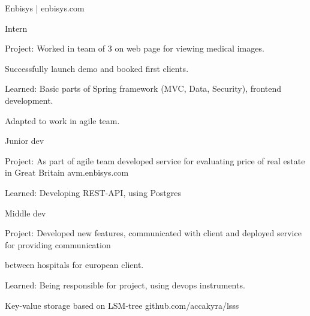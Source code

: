 \documentclass[]{cv-style}
\begin{document}
    {\large{Enbisys | enbisys.com}}
    {\par}
    \vspace{0.2cm}
    {Intern}
    {\par}
    \hspace*{0.7cm} Project: Worked in team of 3 on web page for viewing medical images.
    {\par}
    \hspace*{0.7cm} Successfully launch demo and booked first clients.
    {\par}
    \hspace*{0.7cm} Learned: Basic parts of Spring framework (MVC, Data, Security), frontend development.
    {\par}
    \hspace*{0.7cm} Adapted to work in agile team.
    {\par}
    \vspace{0.1cm}
    {Junior dev}
    {\par}
    \hspace*{0.7cm} Project: As part of agile team developed service for evaluating price of real estate in Great Britain
    avm.enbisys.com
    {\par}
    \hspace*{0.7cm} Learned: Developing REST-API, using Postgres
    {\par}
    \vspace{0.1cm}
    {Middle dev}
    {\par}
    \hspace*{0.7cm} Project: Developed new features, communicated with client and deployed service for providing communication
    {\par}
    \hspace*{0.7cm} between hospitals for european client.
    {\par}
    \hspace*{0.7cm} Learned: Being responsible for project, using devops instruments.
    {\par}
    \vspace{0.3cm}

    \vspace{1cm}


    \hspace*{0.7cm} {Key-value storage based on LSM-tree github.com/accakyra/lsss}

    \vspace{1cm}
\end{document}
